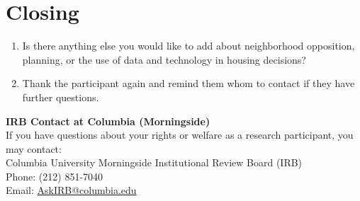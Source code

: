 \documentclass[10pt, letterpaper]{article}
\begin{document}
\section*{Closing}
\begin{enumerate}[leftmargin=*, label=\arabic*.]
    \item Is there anything else you would like to add about neighborhood opposition, planning, or the use of data and technology in housing decisions?
    \item Thank the participant again and remind them whom to contact if they have further questions.
\end{enumerate}

\vfill
\noindent \textbf{IRB Contact at Columbia (Morningside)} \\
If you have questions about your rights or welfare as a research participant, you may contact: \\
Columbia University Morningside Institutional Review Board (IRB) \\
Phone: (212) 851-7040 \\
Email: \href{mailto:AskIRB@columbia.edu}{AskIRB@columbia.edu}
\end{document}
